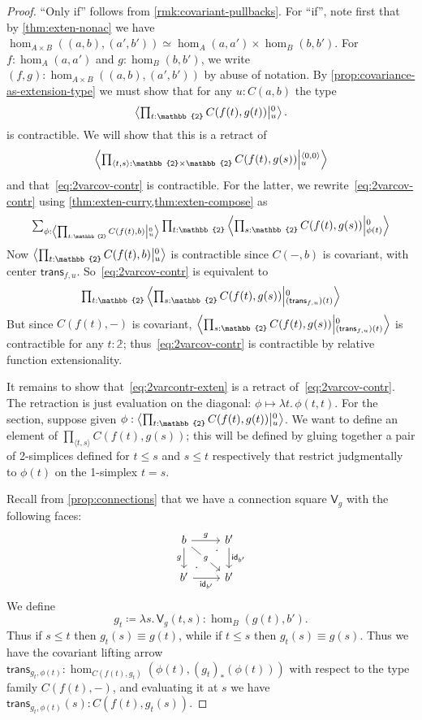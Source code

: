 \documentclass{amsart}
\theoremstyle{plain}
\theoremstyle{definition}
\theoremstyle{remark}
\numberwithin{equation}{section}
\newcommand{\tprod}{\textstyle\prod}
\newcommand{\tsum}{\textstyle\sum}
\newcommand{\exten}[4]{\left\langle\mathchoice{\textstyle\prod_{#1}}{\textstyle\prod_{#1}}{\scriptstyle\prod_{#1}}{\scriptscriptstyle\prod_{#1}} #2 \middle|^{#3}_{#4}\right\rangle}
\newcommand{\jdeq}{\equiv}
\newcommand{\defeq}{\coloneqq}
\newcommand{\pair}[1]{\langle #1\rangle}
\newcommand{\connmax}[1]{\mathsf{V}_{#1}}
\newcommand{\lam}[1]{\lambda #1.\,}
\newcommand{\two}{\mathbb{2}}
\newcommand{\idarr}[1]{\mathsf{id}_{#1}}
\newcommand{\covtr}[1]{{#1}_*}  %
\newcommand{\istrans}[2]{\mathsf{trans}_{#1,#2}}
\begin{document}
\begin{proof}
  ``Only if'' follows from \cref{rmk:covariant-pullbacks}.
  For ``if'', note first that by \cref{thm:exten-nonac} we have $\hom_{A\times B}((a,b),(a',b'))\simeq \hom_A(a,a')\times \hom_B(b,b')$. For  $f:\hom_A(a,a')$ and $g:\hom_B(b,b')$, we write $(f,g):\hom_{A\times B}((a,b),(a',b'))$ by abuse of notation.
{ By \cref{prop:covariance-as-extension-type} we must show that for any $u:C(a,b)$ the type
 \begin{equation}
    \exten{t:\two}{C(f(t),g(t))}{0}{u}.\label{eq:2varcontr-exten}
  \end{equation}
  is contractible.}
  We will show that this is a retract of
  \begin{equation}
    \exten{\pair{t,s}:\two\times\two}{C(f(t),g(s))}{\pair{0,0}}{u}\label{eq:2varcov-contr}
  \end{equation}
  and that~\eqref{eq:2varcov-contr} is contractible.
  For the latter, we rewrite~\eqref{eq:2varcov-contr} using \cref{thm:exten-curry,thm:exten-compose} as
  \[ \tsum_{\phi:\exten{t:\two}{C(f(t),b)}{0}{u}} \tprod_{t:\two} \exten{s:\two}{C(f(t),g(s))}{0}{\phi(t)} \]
  Now ${\exten{t:\two}{C(f(t),b)}{0}{u}}$ is contractible since $C(-,b)$ is covariant, with center $\istrans f u$.
  So~\eqref{eq:2varcov-contr} is equivalent to
  \[ \tprod_{t:\two} \exten{s:\two}{C(f(t),g(s))}{0}{(\istrans f u)(t)} \]
  But since $C(f(t),-)$ is covariant, $\exten{s:\two}{C(f(t),g(s))}{0}{(\istrans f u)(t)}$ is contractible for any $t:\two$; thus~\eqref{eq:2varcov-contr} is contractible by relative function extensionality.

  It remains to show that~\eqref{eq:2varcontr-exten} is a retract of~\eqref{eq:2varcov-contr}.
  The retraction is just evaluation on the diagonal: $\phi \mapsto \lam{t} \phi(t,t)$.
  For the section, suppose given $\phi:\exten{t:\two}{C(f(t),g(t))}{0}{u}$.  We want to define an element of $\prod_{\pair{t,s}} C(f(t),g(s))$; this will be defined by gluing together a pair of 2-simplices defined for $t \le s$ and $s \le t$ respectively that restrict judgmentally to  $\phi(t)$ on the 1-simplex $t = s$.

  Recall from \cref{prop:connections} that we have a connection square $\connmax g$ with the following faces:
  \[
  \begin{tikzcd}
    b \arrow[r, "g"] \arrow[dr, "g" description] \arrow[d, "g"'] & b' \arrow[d, "\idarr{b'}"] \\ b' \arrow[r, "\idarr{b'}"']  \arrow[ur, phantom, "\cdot" very near start, "\cdot" very near end] & b'
  \end{tikzcd}
  \]
  We define
  \[ g_t \defeq \lam{s} \connmax g(t,s) : \hom_B(g(t),b'). \]
  Thus if $s\le t$ then $g_t(s)\jdeq g(t)$, while if $t\le s$ then $g_t(s)\jdeq g(s)$.
  Thus we have the covariant lifting arrow $\istrans{g_t}{\phi(t)} : \hom_{C(f(t),g_t)}(\phi(t),\covtr{(g_t)}{(\phi(t))})$ with respect to the type family $C(f(t),-)$, and evaluating it at $s$ we have $\istrans{g_t}{\phi(t)}(s): C(f(t),g_t(s))$.


\end{proof}
\end{document}
